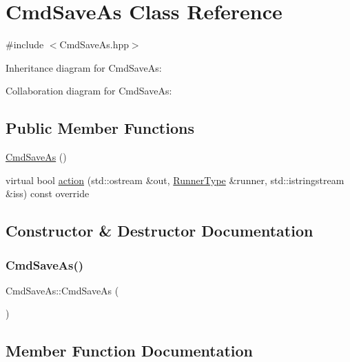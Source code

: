 \hypertarget{classCmdSaveAs}{}\section{Cmd\+Save\+As Class Reference}
\label{classCmdSaveAs}


{\ttfamily \#include $<$Cmd\+Save\+As.\+hpp$>$}



Inheritance diagram for Cmd\+Save\+As\+:


Collaboration diagram for Cmd\+Save\+As\+:
\subsection*{Public Member Functions}
\begin{DoxyCompactItemize}
\item 
\hyperlink{classCmdSaveAs_a8b34fcd8a762a3a6be87dcaee290d304}{Cmd\+Save\+As} ()
\item 
virtual bool \hyperlink{classCmdSaveAs_a12607c0c78b9eec192fa11d6addbb567}{action} (std\+::ostream \&out, \hyperlink{Command_8hpp_ad45c3de597c2023a8be0399d914161f4}{Runner\+Type} \&runner, std\+::istringstream \&iss) const override
\end{DoxyCompactItemize}


\subsection{Constructor \& Destructor Documentation}
\mbox{\label{classCmdSaveAs_a8b34fcd8a762a3a6be87dcaee290d304}} 
\subsubsection{\texorpdfstring{Cmd\+Save\+As()}{CmdSaveAs()}}
{\footnotesize\ttfamily Cmd\+Save\+As\+::\+Cmd\+Save\+As (\begin{DoxyParamCaption}{ }\end{DoxyParamCaption})}



\subsection{Member Function Documentation}
\mbox{\label{classCmdSaveAs_a12607c0c78b9eec192fa11d6addbb567}} 

